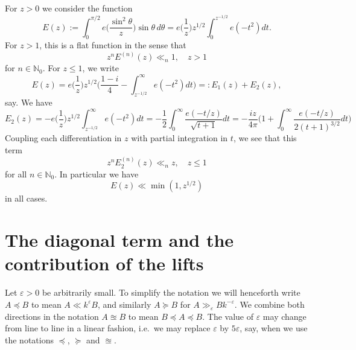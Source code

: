 \documentclass[11pt]{amsart}
\numberwithin{equation}{section}
\theoremstyle{plain}
\theoremstyle{definition}
\renewcommand{\leq}{\le}
\numberwithin{equation}{section}
\begin{document}

For $z > 0$ we consider the function
\begin{equation}\label{defE}
E(z) := \int_0^{\pi/2}  e\Big(\frac{\sin^2\theta}{z}\Big) \sin\theta\, d\theta =  e\Big(\frac{1}{z}\Big)z^{1/2}\int_0^{z^{-1/2}} e(-t^2) dt. 
\end{equation}
For $z > 1$, this is a flat function in the sense that  
\begin{equation}\label{Esmall}
   z^n E^{(n)}(z) \ll_n  1, \quad z > 1
   \end{equation}
   for $n \in \mathbb{N}_0$. 
   For $z \leq 1$, we write
\begin{equation}\label{Ebig}
E(z) = e\Big(\frac{1}{z}\Big)z^{1/2}\Big( \frac{1-i}{4} - \int_{z^{-1/2}}^{\infty}  e(-t^2) dt\Big) =: E_1(z) + E_2(z),
\end{equation}
say. We have 
\[ E_2(z) = - e\Big(\frac{1}{z}\Big) z^{1/2}  \int_{z^{-1/2}}^{\infty}  e(-t^2) dt = -\frac{1}{2} \int_0^{\infty} \frac{e(-t/z)}{\sqrt{t+1}} dt = -\frac{iz }{4\pi}\Big(1 + \int_0^{\infty} \frac{e(-t/z)}{2(t+1)^{3/2}} dt \Big) \]
Coupling each differentiation in $z$ with partial integration in $t$, we see that this term
\begin{equation}\label{Ebig2}
z^nE^{(n)}_2(z)  \ll_n z , \quad z \leq 1
\end{equation}
for all $n \in \mathbb{N}_0. $ In particular we have 
\begin{equation}\label{Egen}
E(z) \ll \min(1, z^{1/2})
\end{equation}
 in all cases. 


\section{The diagonal term and the contribution of the lifts} \label{diag-section}

Let $\varepsilon> 0$ be arbitrarily small. To simplify the notation we will henceforth write $A \preccurlyeq B$ to mean $A \ll  k^{\varepsilon} B$, and similarly $A \succcurlyeq B$ for $A \gg_{\varepsilon} Bk^{-\varepsilon}$. We combine both directions in the notation $A \approxeq B$ to mean $B \preccurlyeq A\preccurlyeq B$. The value of $\varepsilon$  may change from line to line in a linear fashion, i.e.\ we may replace $\varepsilon$ by $5\varepsilon$, say, when we use the notations $\preccurlyeq$, $\succcurlyeq$  and $\approxeq$. 
\end{document}
